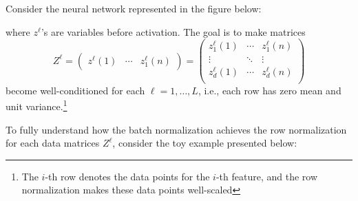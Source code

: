 \begin{example}
Consider the neural network represented in the figure below:
\begin{center}
\end{center}
where $z^{\ell}$'s are variables before activation. 
The goal is to make matrices 
\[Z^{\ell}=
\begin{pmatrix}
z^{\ell}(1)&\cdots&z_1^{\ell}(n)
\end{pmatrix}=\begin{pmatrix}
z_1^{\ell}(1)&\cdots&z_1^{\ell}(n)\\
\vdots&\ddots&\vdots\\
z_d^{\ell}(1)&\cdots&z_d^{\ell}(n)\\
\end{pmatrix}
\]
 become well-conditioned for each $\ell=1,\dots,L$, i.e., each row has zero mean and unit variance.\footnote{The $i$-th row denotes the data points for the $i$-th feature, and the row normalization makes these data points well-scaled}
\end{example}

To fully understand how the batch normalization achieves the row normalization for each data matrices $Z^{\ell}$, consider the toy example presented below:

